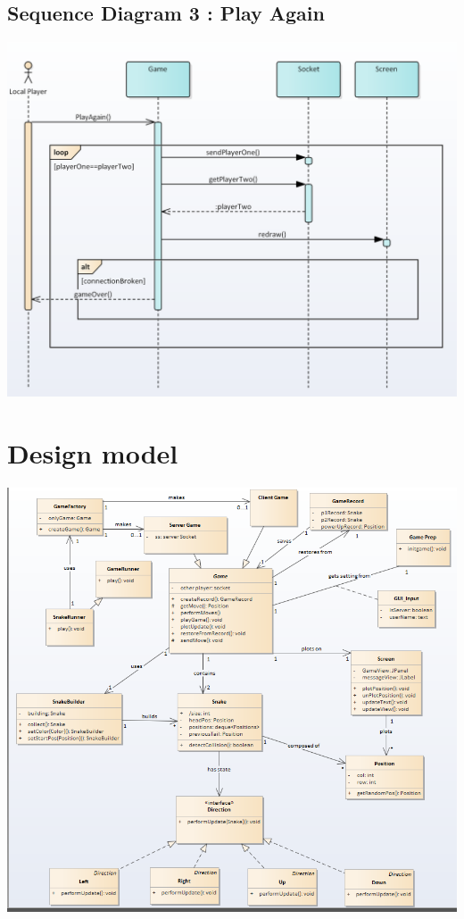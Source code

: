 \documentclass[titlepage]{article}
\begin{document}
	\subsection{Sequence Diagram 3 : Play Again}
	\includegraphics[scale=1]{Sequence3}
	
	\section{Design model}
	\includegraphics[scale=.75]{DesignModel_better}
	
\end{document}
